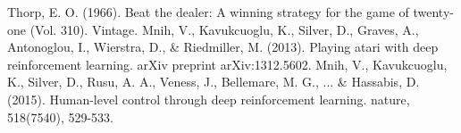 \documentclass[conference]{IEEEtran}
\begin{document}


\begin{thebibliography}{00}
 Thorp, E. O. (1966). Beat the dealer: A winning strategy for the game of twenty-one (Vol. 310). Vintage.
 Mnih, V., Kavukcuoglu, K., Silver, D., Graves, A., Antonoglou, I., Wierstra, D., \& Riedmiller, M. (2013). Playing atari with deep reinforcement learning. arXiv preprint arXiv:1312.5602.
 Mnih, V., Kavukcuoglu, K., Silver, D., Rusu, A. A., Veness, J., Bellemare, M. G., ... \& Hassabis, D. (2015). Human-level control through deep reinforcement learning. nature, 518(7540), 529-533.
\end{thebibliography}
\end{document}
